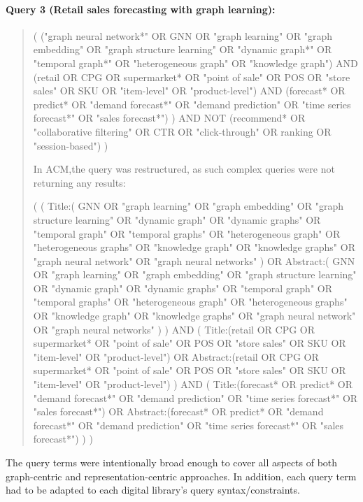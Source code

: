 \paragraph{Query 3 (Retail sales forecasting with graph learning):}
\begin{quote}

( ("graph neural network*" OR GNN OR "graph learning" OR "graph embedding" OR
"graph structure learning" OR "dynamic graph*" OR "temporal graph*" OR
"heterogeneous graph" OR "knowledge graph")
AND
(retail OR CPG OR supermarket* OR "point of sale" OR POS OR "store sales" OR
SKU OR "item-level" OR "product-level")
AND
(forecast* OR predict* OR "demand forecast*" OR "demand prediction" OR
"time series forecast*" OR "sales forecast*") )
AND NOT
(recommend* OR "collaborative filtering" OR CTR OR "click-through" OR ranking OR
"session-based")
)

In ACM,the query was restructured, as such complex queries were not returning any results:

(   (     Title:(       GNN OR "graph learning" OR "graph embedding" OR "graph structure learning"       OR "dynamic graph" OR "dynamic graphs"       OR "temporal graph" OR "temporal graphs"       OR "heterogeneous graph" OR "heterogeneous graphs"       OR "knowledge graph" OR "knowledge graphs"       OR "graph neural network" OR "graph neural networks"     )     OR Abstract:(       GNN OR "graph learning" OR "graph embedding" OR "graph structure learning"       OR "dynamic graph" OR "dynamic graphs"       OR "temporal graph" OR "temporal graphs"       OR "heterogeneous graph" OR "heterogeneous graphs"       OR "knowledge graph" OR "knowledge graphs"       OR "graph neural network" OR "graph neural networks"     )   )   AND   (     Title:(retail OR CPG OR supermarket* OR "point of sale" OR POS OR "store sales" OR SKU OR "item-level" OR "product-level")     OR Abstract:(retail OR CPG OR supermarket* OR "point of sale" OR POS OR "store sales" OR SKU OR "item-level" OR "product-level")   )   AND   (     Title:(forecast* OR predict* OR "demand forecast*" OR "demand prediction" OR "time series forecast*" OR "sales forecast*")     OR Abstract:(forecast* OR predict* OR "demand forecast*" OR "demand prediction" OR "time series forecast*" OR "sales forecast*")   ) )

\end{quote}
The query terms were intentionally broad enough to cover all aspects of both graph-centric and representation-centric approaches. In addition, each query term had to be adapted to each digital library's query syntax/constraints.

